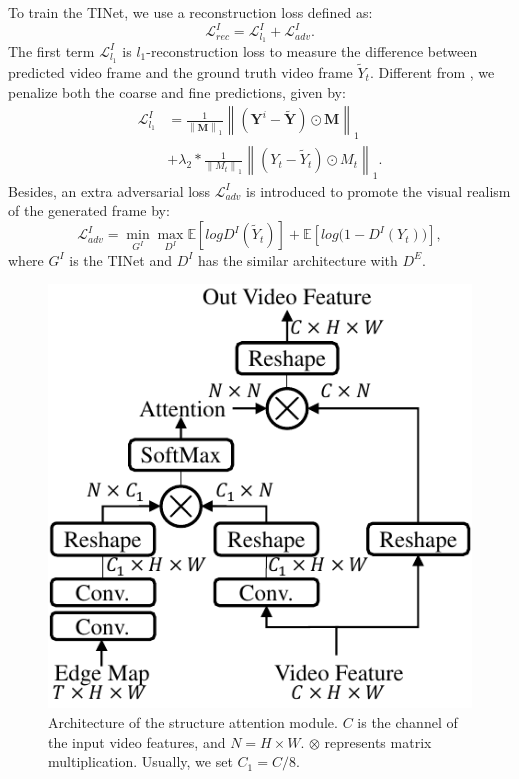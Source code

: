 To train the TINet, we use a reconstruction loss defined as:
%
\begin{equation}
	\label{eq:1}
		\mathcal{L}^{I}_{rec}=\mathcal{L}^{I}_{l_1}+\mathcal{L}^I_{adv}.
\end{equation}
%
The first term $\mathcal{L}^{I}_{l_1}$ is $l_1$-reconstruction loss to measure the difference between predicted video frame and the ground truth video frame $\widetilde{Y}_t$.
Different from \cite{nazeri2019edgeconnect}, we penalize both the coarse and fine predictions, given by:
\begin{equation}
	\begin{aligned}
		\mathcal{L}^{I}_{l_1}&=\frac{1}{\left\|\boldsymbol{M} \right\|_1}\left\|(\boldsymbol{Y}^i-\widetilde{\boldsymbol{Y}})\odot \boldsymbol{M}\right\|_1\\ &+\lambda_2*\frac{1}{\left\|M_t \right\|_1}\left\|(Y_t-\widetilde{Y}_t)\odot M_t\right\|_1.
	\end{aligned}
\end{equation}
%
%
Besides, an extra adversarial loss $\mathcal{L}^I_{adv}$ is introduced to promote the visual realism of the generated frame by:
\begin{equation}
	\label{eq:inp_adver}
	\mathcal{L}^I_{adv}=\min\limits_{G^I} \max \limits_{D^I}\mathbb{E}[logD^I(\widetilde{Y}_t)]+\mathbb{E}[log\big(1-D^I(Y_{t})\big)],
\end{equation}
where $G^I$ is the TINet and $D^I$ has the similar architecture with $D^E$.%
 \begin{figure}[t]
	\centering
	\includegraphics[width=0.7\columnwidth]{SEM} %
	\caption{Architecture of the structure attention module. $C$ is the channel of the input video features, and $N=H\times W$. $\otimes$ represents matrix multiplication. Usually, we set $C_1=C/8$.}
	\label{SEM}
\end{figure} 


